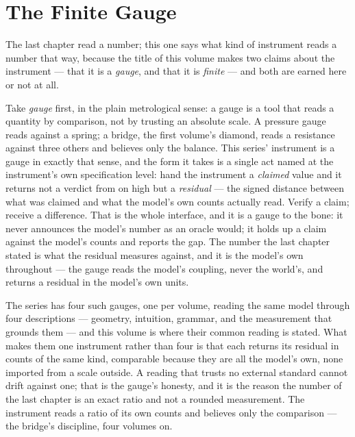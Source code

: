 \chapter{The Finite Gauge}

The last chapter read a number; this one says what kind of instrument
reads a number that way, because the title of this volume makes two claims
about the instrument --- that it is a \emph{gauge}, and that it is
\emph{finite} --- and both are earned here or not at all.

Take \emph{gauge} first, in the plain metrological sense: a gauge is a
tool that reads a quantity by comparison, not by trusting an absolute
scale. A pressure gauge reads against a spring; a bridge, the first volume's
diamond, reads a resistance against three others and believes only the
balance. This series' instrument is a gauge in exactly that sense, and the
form it takes is a single act named at the instrument's own specification
level: hand the instrument a \emph{claimed} value and it returns not a
verdict from on high but a \emph{residual} --- the signed distance between
what was claimed and what the model's own counts actually read. Verify a
claim; receive a difference. That is the whole interface, and it is a gauge
to the bone: it never announces the model's number as an oracle would; it
holds up a claim against the model's counts and reports the gap. The number
the last chapter stated is what the residual measures against, and it is
the model's own throughout --- the gauge reads the model's coupling, never
the world's, and returns a residual in the model's own units.

The series has four such gauges, one per volume, reading the same model
through four descriptions --- geometry, intuition, grammar, and the
measurement that grounds them --- and this volume is where their common
reading is stated. What makes them one instrument rather than four is that
each returns its residual in counts of the same kind, comparable because
they are all the model's own, none imported from a scale outside. A reading
that trusts no external standard cannot drift against one; that is the
gauge's honesty, and it is the reason the number of the last chapter is an
exact ratio and not a rounded measurement. The instrument reads a ratio of
its own counts and believes only the comparison --- the bridge's
discipline, four volumes on.

